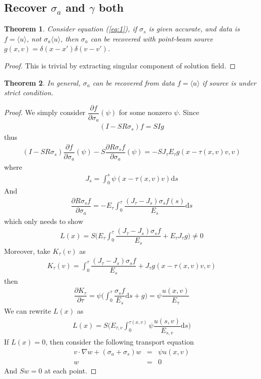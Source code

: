 \documentclass[12pt,a4paper]{article}
\newcommand{\avg}[1]{\langle#1\rangle}
\newtheorem{Thm}{Theorem}
\begin{document}
\subsection{Recover $\sigma_a$ and $\gamma$ both}
\begin{Thm}
Consider equation (\ref{eq:1}), if $\sigma_s$ is given accurate, and data is $f= \avg{u}$, not $\sigma_a\avg{u}$, then $\sigma_a$ can be recovered with point-beam source $g(x,v) = \delta(x-x')\delta(v-v')$.
\end{Thm}
\begin{proof}
This is trivial by extracting singular component of solution field.
\end{proof}
\begin{Thm}
In general, $\sigma_a$ can be recovered from data $f = \avg{u}$ if source is under \textit{strict} condition.
\end{Thm}
\begin{proof}
We simply consider $\dfrac{\partial f}{\partial \sigma_a}(\psi)$ for some nonzero $\psi$. Since
\begin{eqnarray}
(I-SR\sigma_s)f = SIg
\end{eqnarray}
thus
\begin{eqnarray}
(I-SR\sigma_s)\dfrac{\partial f}{\partial \sigma_a}(\psi) - S\dfrac{\partial R\sigma_s f}{\partial \sigma_a}(\psi) = -SJ_{\tau} E_{\tau} g(x-\tau(x,v)v,v)
\end{eqnarray}
where 
\begin{eqnarray}
J_s = \int_0^s \psi(x-\tau(x,v)v)\mathrm{d}s
\end{eqnarray}
And 
\begin{eqnarray}
\dfrac{\partial R\sigma_s f}{\partial\sigma_a} = -E_{\tau}\int_0^{\tau} \dfrac{(J_{\tau} - J_s)\sigma_s f(s)}{E_s}\mathrm{d}s
\end{eqnarray}
which only needs to show
\begin{eqnarray}
L(x) = S\Big(E_{\tau}\int_0^{\tau}\dfrac{(J_{\tau} - J_s)\sigma_s f}{E_s} + E_{\tau} J_{\tau} g\Big)\neq 0
\end{eqnarray}
Moreover, take $K_{\tau}(v)$ as
\begin{eqnarray}
K_{\tau}(v) = \int_0^{\tau}\dfrac{(J_{\tau} - J_s)\sigma_s f}{E_s} +  J_{\tau} g(x-\tau(x,v)v,v)
\end{eqnarray}
then
\begin{eqnarray}
\dfrac{\partial K_{\tau}}{\partial\tau} = \psi\Big(\int_0^{\tau}\dfrac{\sigma_s f}{E_s}\mathrm{d}s + g\Big) = \psi \dfrac{u(x,v)}{E_{\tau}}
\end{eqnarray}
We can rewrite $L(x)$ as
\begin{eqnarray}
L(x)  = S\Big(E_{\tau,v} \int_0^{\tau(x,v)} \psi \dfrac{u(s,v)}{E_{s,v}}\mathrm{d}s\Big)
\end{eqnarray}
If $L(x) = 0$, then consider the following transport equation
\begin{eqnarray}
v \cdot \nabla w + (\sigma_a + \sigma_s)w &=& \psi u(x,v)\\
w &=& 0
\end{eqnarray}
And $Sw = 0$ at each point. 
\end{proof}
\end{document}
